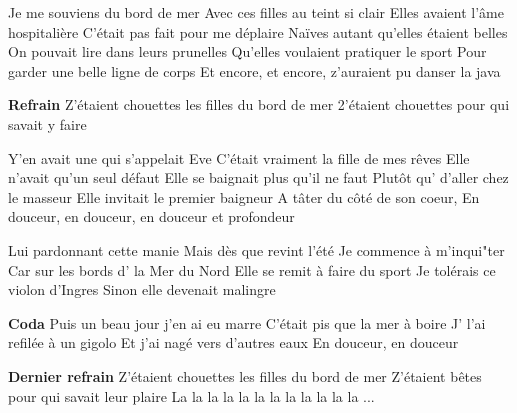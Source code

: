 \footnotemark [
ititle={Filles du bord de mer, les}]


\beginverse
Je me souviens du bord de mer
Avec ces filles au teint si clair
Elles avaient l'âme hospitalière
C'était pas fait pour me déplaire
Naïves autant qu'elles étaient belles
On pouvait lire dans leurs prunelles
Qu'elles voulaient pratiquer le sport
Pour garder une belle ligne de corps
Et encore, et encore, z'auraient pu danser la java
\endverse

\beginchorus
\textbf{Refrain}
Z'étaient chouettes les filles du bord de mer
2'étaient chouettes pour qui savait y faire
\endchorus

\beginverse
Y'en avait une qui s'appelait Eve
C'était vraiment la fille de mes rêves
Elle n'avait qu'un seul défaut
Elle se baignait plus qu'il ne faut
Plutôt qu' d'aller chez le masseur
Elle invitait le premier baigneur
A tâter du côté de son coeur,
En douceur, en douceur, en douceur et profondeur
\endverse

\beginverse
Lui pardonnant cette manie
Mais dès que revint l'été
Je commence à m'inqui"ter
Car sur les bords d' la Mer du Nord
Elle se remit à faire du sport
Je tolérais ce violon d'Ingres
Sinon elle devenait malingre
\endverse

\beginverse
\textbf{Coda}
Puis un beau jour j'en ai eu marre
C'était pis que la mer à boire
J' l'ai refilée à un gigolo
Et j'ai nagé vers d'autres eaux
En douceur, en douceur
\endverse

\beginchorus
\textbf{Dernier refrain}
Z'étaient chouettes les filles du bord de mer
Z'étaient bêtes pour qui savait leur plaire
La la la la la la la la la la la la ...
\endchorus
\endsong